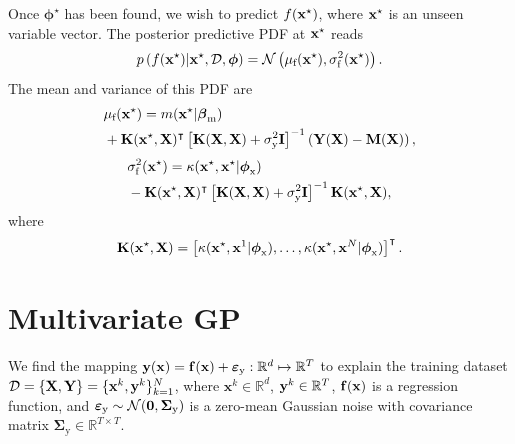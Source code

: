 \documentclass[iicol,sn-basic]{sn-jnl}%
\begin{document}
\begin{appendices}
Once ${\boldsymbol \phi^\star}$ has been found, we wish to predict $f({\bf x}^\star)$, where ${\bf x}^\star$ is an unseen variable vector.
The posterior predictive PDF at ${\bf x}^\star$ reads
\begin{equation}\label{eqnA5}
	p\left(f({\bf x}^\star)|{\bf x}^\star,\mathcal{D},\boldsymbol \phi\right) = \mathcal{N}\left(\mu_\text{f}({\bf x}^\star),\sigma_\text{f}^2({\bf x}^\star)\right).
\end{equation}
The mean and variance of this PDF are
\begin{equation}\label{eqnA6}
	\begin{aligned}
	& \mu_\text{f}({\bf x}^\star)=m({\bf x}^\star|\boldsymbol \beta_{\text{m}}) \\
	& + {\bf K}({\bf x}^\star,{\bf X})^\intercal \left[ {\bf K}({\bf X},{\bf X})+\sigma^2_\text{y} {\bf I}\right]^{-1} \left({\bf Y}({\bf X})-{\bf M} ({\bf X})\right),
	\end{aligned}
\end{equation}
\begin{equation}\label{eqnA7}
	\begin{aligned}
	& \sigma_\text{f}^2({\bf x}^\star)=\kappa({\bf x}^\star,{\bf x}^\star|\boldsymbol \phi_{\text{x}})\\
	& -{\bf K}({\bf x}^\star,{\bf X})^\intercal \left[ {\bf K}({\bf X},{\bf X})+\sigma^2_\text{y} {\bf I}\right]^{-1} {\bf K}({\bf x}^\star,{\bf X}),
	\end{aligned}
\end{equation}
where
\begin{equation}\label{eqnA8}
	{\bf K}({\bf x}^\star,{\bf X})= \left[\kappa({\bf x}^\star,{\bf x}^1|\boldsymbol \phi_{\text{x}}),\dots,\kappa({\bf x}^\star,{\bf x}^N|\boldsymbol \phi_{\text{x}})\right]^\intercal.
\end{equation}

\section{Multivariate GP}\label{AppB}
\setcounter{equation}{0} %
\renewcommand{\theequation}{B.\arabic{equation}} %

We find the mapping ${\bf y}({\bf x})={\bf f}({\bf x}) + \boldsymbol{\varepsilon}_\text{y}: \mathbb{R}^d \mapsto \mathbb{R}^T$ to explain the training dataset $\mathcal{D}=\left\{ {\bf X},{\bf Y}\right\}=\{{\bf x}^k,{\bf y}^k\}_{k=1}^N$, where $\textbf{x}^k\in\mathbb{R}^d$, ${\bf y}^k\in\mathbb{R}^T$, ${\bf f}({\bf x})$ is a regression function, and $\boldsymbol{\varepsilon}_\text{y} \sim \mathcal{N}({\bf 0},\boldsymbol{\Sigma}_\text{y})$ is a zero-mean Gaussian noise with covariance matrix $\boldsymbol{\Sigma}_\text{y} \in \mathbb{R}^{T \times T}$.


\end{appendices}
\end{document}

